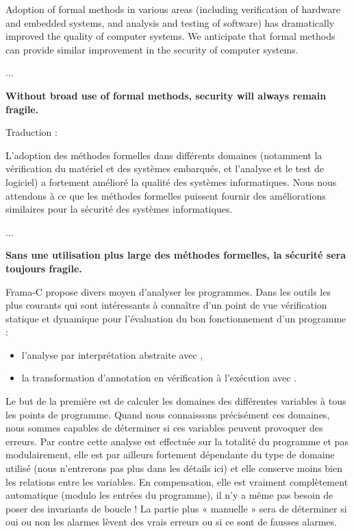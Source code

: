 \documentclass[middle]{zmdocument}
\begin{document}
\begin{Quotation}
Adoption of formal methods in various areas (including verification of hardware
and embedded systems, and analysis and testing of software) has dramatically 
improved the quality of computer systems.  We anticipate that formal methods 
can provide similar improvement in the security of computer systems.

...

\textbf{Without broad use of formal methods, security will always remain fragile.}
\end{Quotation}



\begin{Spoiler}
Traduction :

\begin{Quotation}
L'adoption des méthodes formelles dans différents domaines (notamment la 
vérification du matériel et des systèmes embarqués, et l'analyse et le test
de logiciel) a fortement amélioré la qualité des systèmes informatiques. 
Nous nous attendons à ce que les méthodes formelles puissent fournir des 
améliorations similaires pour la sécurité des systèmes informatiques.

...

\textbf{Sans une utilisation plus large des méthodes formelles, la sécurité sera
toujours fragile.}
\end{Quotation}
\end{Spoiler}






Frama-C propose divers moyen d'analyser les programmes. Dans les outils les
plus courants qui sont intéressants à connaître d'un point de vue vérification
statique et dynamique pour l'évaluation du bon fonctionnement d'un programme :



\begin{itemize}
\item l'analyse par interprétation abstraite avec 
,
\item la transformation d'annotation en vérification à l'exécution avec 
.
\end{itemize}


Le but de la première est de calculer les domaines des différentes variables à
tous les points de programme. Quand nous connaissons précisément ces domaines,
nous sommes capables de déterminer si ces variables peuvent provoquer des erreurs.
Par contre cette analyse est effectuée sur la totalité du programme et pas 
modulairement, elle est par ailleurs fortement dépendante du type de domaine 
utilisé (nous n'entrerons pas plus dans les détails ici) et elle conserve moins
bien les relations entre les variables. En compensation, elle est vraiment 
complètement automatique (modulo les entrées du programme), il n'y a même pas
besoin de poser des invariants de boucle ! La partie plus « manuelle » sera de
déterminer si oui ou non les alarmes lèvent des vrais erreurs ou si ce sont de
fausses alarmes.
\end{document}
